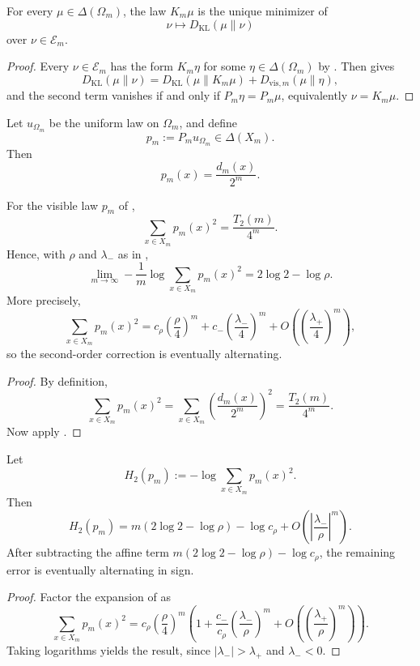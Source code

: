 \begin{corollary}
\label{cor:i-projection}
For every \(\mu\in\Delta(\Omega_m)\), the law \(K_m\mu\) is the unique minimizer
of
\[
  \nu\longmapsto D_{\mathrm{KL}}(\mu\|\nu)
\]
over \(\nu\in\mathcal E_m\).
\end{corollary}

\begin{proof}
Every \(\nu\in\mathcal E_m\) has the form \(K_m\eta\) for some
\(\eta\in\Delta(\Omega_m)\) by .  Then
 gives
\[
  D_{\mathrm{KL}}(\mu\|\nu)
  =
  D_{\mathrm{KL}}(\mu\|K_m\mu)+D_{\mathrm{vis},m}(\mu\|\eta),
\]
and the second term vanishes if and only if \(P_m\eta=P_m\mu\), equivalently
\(\nu=K_m\mu\).
\end{proof}

\begin{definition}
\label{def:visible-law}
Let \(u_{\Omega_m}\) be the uniform law on \(\Omega_m\), and define
\[
  p_m:=P_mu_{\Omega_m}\in\Delta(X_m).
\]
Then
\[
  p_m(x)=\frac{d_m(x)}{2^m}.
\]
\end{definition}

\begin{theorem}
\label{thm:collision-entropy-rate}
For the visible law \(p_m\) of ,
\[
  \sum_{x\in X_m}p_m(x)^2=\frac{T_2(m)}{4^m}.
\]
Hence, with \(\rho\) and \(\lambda_-\) as in
,
\[
  \lim_{m\to\infty}
  -\frac{1}{m}\log \sum_{x\in X_m}p_m(x)^2
  =
  2\log 2-\log \rho.
\]
More precisely,
\[
  \sum_{x\in X_m}p_m(x)^2
  =
  c_\rho\left(\frac{\rho}{4}\right)^m
  +
  c_-\left(\frac{\lambda_-}{4}\right)^m
  +
  O\left(\left(\frac{\lambda_+}{4}\right)^m\right),
\]
so the second-order correction is eventually alternating.
\end{theorem}

\begin{proof}
By definition,
\[
  \sum_{x\in X_m}p_m(x)^2
  =
  \sum_{x\in X_m}\left(\frac{d_m(x)}{2^m}\right)^2
  =
  \frac{T_2(m)}{4^m}.
\]
Now apply .
\end{proof}

\begin{corollary}
\label{cor:renyi2}
Let
\[
  H_2(p_m):=-\log \sum_{x\in X_m}p_m(x)^2.
\]
Then
\[
  H_2(p_m)
  =
  m(2\log 2-\log \rho)-\log c_\rho
  +
  O\left(\left|\frac{\lambda_-}{\rho}\right|^m\right).
\]
After subtracting the affine term
\(m(2\log 2-\log \rho)-\log c_\rho\), the remaining error is eventually
alternating in sign.
\end{corollary}

\begin{proof}
Factor the expansion of  as
\[
  \sum_{x\in X_m}p_m(x)^2
  =
  c_\rho\left(\frac{\rho}{4}\right)^m
  \left(
    1+\frac{c_-}{c_\rho}\left(\frac{\lambda_-}{\rho}\right)^m
    +O\left(\left(\frac{\lambda_+}{\rho}\right)^m\right)
  \right).
\]
Taking logarithms yields the result, since
\(|\lambda_-|>\lambda_+\) and \(\lambda_-<0\).
\end{proof}
